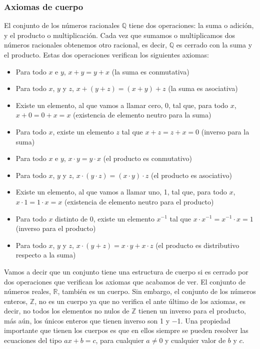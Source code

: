 \documentclass[Análisis.root.tex]{subfiles}
\newcommand{\Z}{\mathbb{Z}}
\newcommand{\Q}{\mathbb{Q}}
\newcommand{\R}{\mathbb{R}}
\begin{document}
        \subsubsection{Axiomas de cuerpo}
        El conjunto de los números racionales \(\Q\) tiene dos operaciones: la suma o adición, y el producto o multiplicación. 
        Cada vez que sumamos o multiplicamos dos números racionales obtenemos otro racional, es decir, \(\Q\) es cerrado con la suma y el producto. 
        Estas dos operaciones verifican los siguientes axiomas:
        \begin{itemize}
            \item Para todo \(x\) e \(y\), \(x + y = y + x\) (la suma es conmutativa)
            \item Para todo \(x\), \(y\) y \(z\), \(x + (y + z) = (x + y) + z\) (la suma es asociativa)
            \item Existe un elemento, al que vamos a llamar cero, 0, tal que, para todo \(x\), \(x + 0 = 0 + x = x\) (existencia de elemento neutro para la suma)
            \item Para todo \(x\), existe un elemento \(z\) tal que \(x + z = z + x = 0\) (inverso para la suma)
            \item Para todo \(x\) e \(y\), \(x \cdot y = y \cdot x\) (el producto es conmutativo)
            \item Para todo \(x\), \(y\) y \(z\), \(x \cdot (y \cdot z) = (x \cdot y) \cdot z\) (el producto es asociativo)
            \item Existe un elemento, al que vamos a llamar uno, 1, tal que, para todo \(x\), \(x \cdot 1 = 1 \cdot x = x\) (existencia de elemento neutro para el producto)
            \item Para todo \(x\) distinto de 0, existe un elemento \(x^{−1}\) tal que \(x \cdot x^{−1} = x^{-1} \cdot x = 1\) (inverso para el producto)
            \item Para todo \(x\), \(y\) y \(z\), \(x \cdot (y + z) = x \cdot y + x \cdot z\) (el producto es distributivo respecto a la suma)
        \end{itemize}
        Vamos a decir que un conjunto tiene una estructura de cuerpo si es cerrado por dos operaciones que verifican los axiomas que acabamos de ver. 
        El conjunto de números reales, \(\R\), también es un cuerpo. Sin embargo, el conjunto de los números enteros, \(\Z\), no es un cuerpo ya que no verifica el ante último de los axiomas, es decir, no todos los elementos no nulos de \(\Z\) tienen un inverso para el producto, más aún, los únicos enteros que tienen inverso son 1 y −1.
        Una propiedad importante que tienen los cuerpos es que en ellos siempre se pueden resolver las ecuaciones del tipo \(ax + b = c\), para cualquier \(a \neq 0\) y cualquier valor de \(b\) y \(c\).
\end{document}
